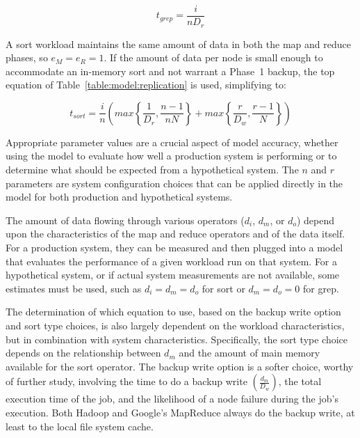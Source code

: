 \begin{equation}
t_{\textstyle grep} = \frac{i}{n D_r}
\label{eqn:grepmodel}
\end{equation}

A sort workload maintains the same amount of data in both the map and
reduce phases, so $e_M = e_R = 1$.  If the amount of data
per node is small enough to accommodate an in-memory sort and not
warrant a Phase~1 backup, the top equation of
Table~\ref{table:model:replication} is used, simplifying to:

\begin{equation}
t_{\textstyle sort} = \frac{i}{n}
\left( max\left\{\frac{1}{D_r}, \frac{n-1}{n N}\right\}
+ max\left\{\frac{r}{D_w}, \frac{r-1}{N}\right\} \right)
\label{eqn:sortmodel2}
\end{equation}


Appropriate parameter values are a crucial aspect of model accuracy,
whether using the model to evaluate how well a production system is
performing or to determine what should be expected from a hypothetical system.
The $n$ and $r$ parameters are system configuration choices that can
be applied directly in the model for both production and hypothetical
systems.

The amount of data flowing through various operators ($d_i$,
$d_m$, or $d_o$) depend upon the characteristics of the map and
reduce operators and of the data itself.  For a production system,
they can be measured and then plugged into a model that evaluates the
performance of a given workload run on that system.  For a
hypothetical system, or if actual system measurements are not
available, some estimates must be used, such as $d_i = d_m = d_o$ for
sort or $d_m = d_o = 0$ for grep.

The determination of which equation to use, based on the backup write
option and sort type choices, is also largely dependent on the
workload characteristics, but in combination with system
characteristics.  Specifically, the sort type choice depends on the
relationship between $d_m$ and the amount of main memory available for
the sort operator.  The backup write option is a softer choice, worthy
of further study, involving the time to do a backup write
$\left(\frac{d_m}{D_w}\right)$, the total execution time of the job,
and the likelihood of a node failure during the job's execution.  Both
Hadoop and Google's MapReduce always do the backup write, at least to
the local file system cache.

